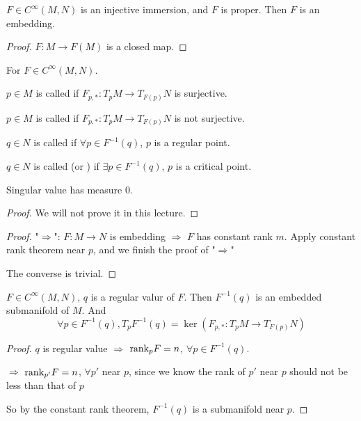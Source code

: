 \begin{proposition}
     $ F\in C^\infty(M,N)  $ is an injective immersion, and  $ F $ is proper. Then  $ F $ is an embedding.   
\end{proposition}
\begin{proof}
     $ F:M\rightarrow F(M) $ is a closed map. 
\end{proof}
\begin{definition}
    For  $ F\in C^\infty(M,N) $.
    
     $ p\in M $ is called  if  $ F_{p,*}:T_pM\rightarrow T_{F(p)}N $ is surjective.
     
      $ p\in M $ is called  if  $ F_{p,*}:T_pM\rightarrow T_{F(p)}N $ is not surjective. 
     
      $ q \in N$ is called  if  $ \forall p\in F^{-1}(q) $,  $ p $ is a regular point.
      
       $ q\in N $ is called (or ) if  $ \exists p\in F^{-1}(q) $,  $ p $ is a critical point. 
\end{definition}
\begin{theorem}[Sard]
    Singular value has measure  $ 0 $. 
\end{theorem}
\begin{proof}
    We will not prove it in this lecture. 
\end{proof}
\begin{proof}
    "$ \Rightarrow $": $ F:M\rightarrow N $ is embedding  $ \Rightarrow  $ $ F $ has constant rank  $ m $. Apply constant rank theorem near  $ p $, and we finish the proof of  "$\Rightarrow $"

    The converse is trivial.
    
\end{proof}
\begin{theorem}
     $ F\in C^\infty(M,N) $,  $ q $ is a regular valur of  $ F $. Then  $ F^{-1}(q) $ is an embedded submanifold of  $ M $. And 
     \[\forall p\in F^{-1}(q),T_pF^{-1}(q)=\ker(F_{p,*}:T_pM\rightarrow T_{F(p)}N)\]     
\end{theorem}
\begin{proof}
     $ q $ is regular value $ \Rightarrow  $ $ \mathrm{rank}_pF=n $, $ \forall p\in F^{-1}(q) $.

      $ \Rightarrow  $ $ \mathrm{rank}_{p'}F=n $,  $ \forall p' $ near  $ p $, since we know  the rank of  $ p' $ near  $ p $ should not be less than that of  $ p $ 
      
      So by the constant rank theorem,  $ F^{-1}(q) $ is a submanifold near  $ p $.  
      
\end{proof}
